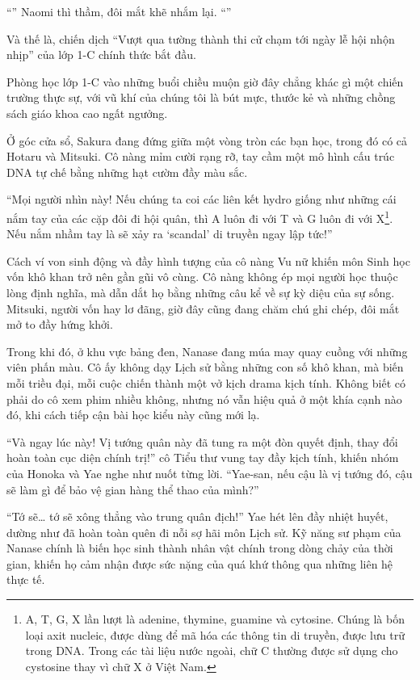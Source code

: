 \documentclass[../main.tex]{subfiles}
\begin{document}
``'' Naomi thì thầm, đôi mắt khẽ nhắm lại. ``''

Và thế là, chiến dịch ``Vượt qua tường thành thi cử chạm tới ngày lễ hội nhộn nhịp'' của lớp 1-C chính thức bắt đầu.

\ct

Phòng học lớp 1-C vào những buổi chiều muộn giờ đây chẳng khác gì một chiến trường thực sự, với vũ khí của chúng tôi là bút mực, thước kẻ và những chồng sách giáo khoa cao ngất ngưởng.

Ở góc cửa sổ, Sakura đang đứng giữa một vòng tròn các bạn học, trong đó có cả Hotaru và Mitsuki. Cô nàng mỉm cười rạng rỡ, tay cầm một mô hình cấu trúc DNA tự chế bằng những hạt cườm đầy màu sắc.

``Mọi người nhìn này! Nếu chúng ta coi các liên kết hydro giống như những cái nắm tay của các cặp đôi đi hội quân, thì A luôn đi với T và G luôn đi với X\footnote{A, T, G, X lần lượt là adenine, thymine, guamine và cytosine. Chúng là bốn loại axit nucleic, được dùng để mã hóa các thông tin di truyền, được lưu trữ trong DNA. Trong các tài liệu nước ngoài, chữ C thường được sử dụng cho cystosine thay vì chữ X ở Việt Nam.}. Nếu nắm nhầm tay là sẽ xảy ra `scandal' di truyền ngay lập tức!''

Cách ví von sinh động và đầy hình tượng của cô nàng Vu nữ khiến môn Sinh học vốn khô khan trở nên gần gũi vô cùng. Cô nàng không ép mọi người học thuộc lòng định nghĩa, mà dẫn dắt họ bằng những câu kể về sự kỳ diệu của sự sống. Mitsuki, người vốn hay lơ đãng, giờ đây cũng đang chăm chú ghi chép, đôi mắt mở to đầy hứng khởi.

Trong khi đó, ở khu vực bảng đen, Nanase đang múa may quay cuồng với những viên phấn màu. Cô ấy không dạy Lịch sử bằng những con số khô khan, mà biến mỗi triều đại, mỗi cuộc chiến thành một vở kịch drama kịch tính. Không biết có phải do cô xem phim nhiều không, nhưng nó vẫn hiệu quả ở một khía cạnh nào đó, khi cách tiếp cận bài học kiểu này cũng mới lạ.

``Và ngay lúc này! Vị tướng quân này đã tung ra một đòn quyết định, thay đổi hoàn toàn cục diện chính trị!'' cô Tiểu thư vung tay đầy kịch tính, khiến nhóm của Honoka và Yae nghe như nuốt từng lời. ``Yae-san, nếu cậu là vị tướng đó, cậu sẽ làm gì để bảo vệ gian hàng thể thao của mình?''

``Tớ sẽ\dots{} tớ sẽ xông thẳng vào trung quân địch!'' Yae hét lên đầy nhiệt huyết, dường như đã hoàn toàn quên đi nỗi sợ hãi môn Lịch sử. Kỹ năng sư phạm của Nanase chính là biến học sinh thành nhân vật chính trong dòng chảy của thời gian, khiến họ cảm nhận được sức nặng của quá khứ thông qua những liên hệ thực tế.
\end{document}
